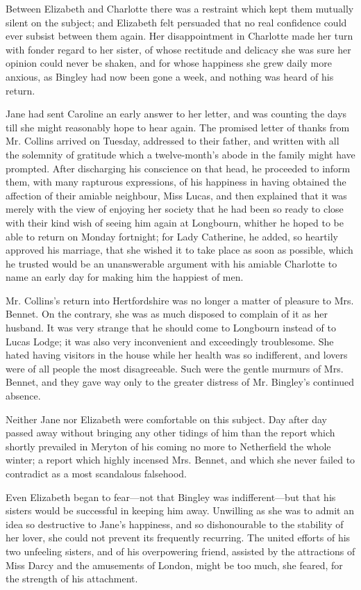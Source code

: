 Between Elizabeth and Charlotte there was a restraint which kept them mutually silent on the subject; and Elizabeth felt persuaded that no real confidence could ever subsist between them again. Her disappointment in Charlotte made her turn with fonder regard to her sister, of whose rectitude and delicacy she was sure her opinion could never be shaken, and for whose happiness she grew daily more anxious, as Bingley had now been gone a week, and nothing was heard of his return.

Jane had sent Caroline an early answer to her letter, and was counting the days till she might reasonably hope to hear again. The promised letter of thanks from Mr. Collins arrived on Tuesday, addressed to their father, and written with all the solemnity of gratitude which a twelve-month's abode in the family might have prompted. After discharging his conscience on that head, he proceeded to inform them, with many rapturous expressions, of his happiness in having obtained the affection of their amiable neighbour, Miss Lucas, and then explained that it was merely with the view of enjoying her society that he had been so ready to close with their kind wish of seeing him again at Longbourn, whither he hoped to be able to return on Monday fortnight; for Lady Catherine, he added, so heartily approved his marriage, that she wished it to take place as soon as possible, which he trusted would be an unanswerable argument with his amiable Charlotte to name an early day for making him the happiest of men.

Mr. Collins's return into Hertfordshire was no longer a matter of pleasure to Mrs. Bennet. On the contrary, she was as much disposed to complain of it as her husband. It was very strange that he should come to Longbourn instead of to Lucas Lodge; it was also very inconvenient and exceedingly troublesome. She hated having visitors in the house while her health was so indifferent, and lovers were of all people the most disagreeable. Such were the gentle murmurs of Mrs. Bennet, and they gave way only to the greater distress of Mr. Bingley's continued absence.

Neither Jane nor Elizabeth were comfortable on this subject. Day after day passed away without bringing any other tidings of him than the report which shortly prevailed in Meryton of his coming no more to Netherfield the whole winter; a report which highly incensed Mrs. Bennet, and which she never failed to contradict as a most scandalous falsehood.

Even Elizabeth began to fear---not that Bingley was indifferent---but that his sisters would be successful in keeping him away. Unwilling as she was to admit an idea so destructive to Jane's happiness, and so dishonourable to the stability of her lover, she could not prevent its frequently recurring. The united efforts of his two unfeeling sisters, and of his overpowering friend, assisted by the attractions of Miss Darcy and the amusements of London, might be too much, she feared, for the strength of his attachment.

